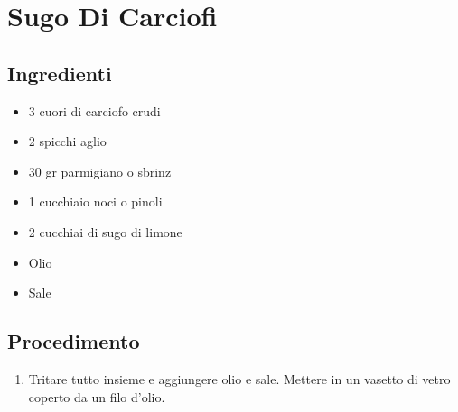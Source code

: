 \section{Sugo Di Carciofi}
\subsection{Ingredienti}
\begin{itemize}
\item 3 cuori di carciofo crudi  
\item 2 spicchi aglio  
\item 30 gr parmigiano o sbrinz  
\item 1 cucchiaio noci o pinoli  
\item 2 cucchiai di sugo di limone  
\item Olio   
\item Sale
\end{itemize}
\subsection{Procedimento}
\begin{enumerate}
\item  Tritare tutto insieme e aggiungere olio e sale. Mettere in un vasetto di vetro coperto da un filo d'olio.
\end{enumerate}

